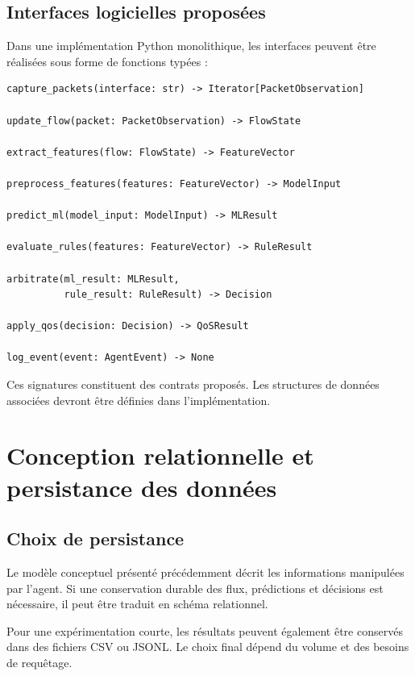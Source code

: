 \subsection{Interfaces logicielles proposées}

Dans une implémentation Python monolithique, les interfaces
peuvent être réalisées sous forme de fonctions typées :

\begin{verbatim}
capture_packets(interface: str) -> Iterator[PacketObservation]

update_flow(packet: PacketObservation) -> FlowState

extract_features(flow: FlowState) -> FeatureVector

preprocess_features(features: FeatureVector) -> ModelInput

predict_ml(model_input: ModelInput) -> MLResult

evaluate_rules(features: FeatureVector) -> RuleResult

arbitrate(ml_result: MLResult,
          rule_result: RuleResult) -> Decision

apply_qos(decision: Decision) -> QoSResult

log_event(event: AgentEvent) -> None
\end{verbatim}

Ces signatures constituent des contrats proposés.
Les structures de données associées devront être définies
dans l'implémentation.

\section{Conception relationnelle et persistance des données}

\subsection{Choix de persistance}

Le modèle conceptuel présenté précédemment décrit les
informations manipulées par l'agent. Si une conservation
durable des flux, prédictions et décisions est nécessaire,
il peut être traduit en schéma relationnel.

Pour une expérimentation courte, les résultats peuvent
également être conservés dans des fichiers CSV ou JSONL.
Le choix final dépend du volume et des besoins de requêtage.

